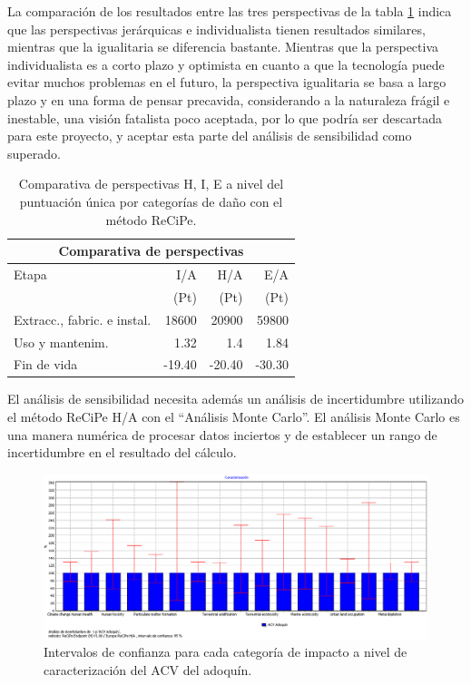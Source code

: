 La comparación de los resultados entre las tres perspectivas de la tabla \ref{comparativa_perspectivas} indica que las perspectivas jerárquicas e individualista tienen resultados similares, mientras que la igualitaria se diferencia bastante. Mientras que la perspectiva individualista es a corto plazo y optimista en cuanto a que la tecnología puede evitar muchos problemas en el futuro, la perspectiva igualitaria se basa a largo plazo y en una forma de pensar precavida, considerando a la naturaleza frágil e inestable, una visión fatalista poco aceptada, por lo que podría ser descartada para este proyecto, y aceptar esta parte del análisis de sensibilidad como superado.

\begin{table}[!htb]
\centering
\begin{tabular}{p{6cm}rrr}
\toprule
\multicolumn{4}{c}{Comparativa de perspectivas}\\
\midrule
Etapa & I/A & H/A & E/A\\
 & (Pt) & (Pt) & (Pt)\\
\midrule
Extracc., fabric. e instal. & 18600 & 20900 & 59800\\
Uso y mantenim. &1.32 & 1.4 & 1.84\\
Fin de vida &-19.40 & -20.40 & -30.30\\
\bottomrule
\end{tabular}
\caption{Comparativa de perspectivas H, I, E a nivel del puntuación única por categorías de daño con el método ReCiPe.}
\label{comparativa_perspectivas}
\end{table}

El análisis de sensibilidad necesita además un análisis de incertidumbre utilizando el método ReCiPe H/A con el ``Análisis Monte Carlo''. El análisis Monte Carlo es una manera numérica de procesar datos inciertos y de establecer un rango de incertidumbre en el resultado del cálculo.

\begin{figure}[!htb]
\centering
\includegraphics[width=15cm]{img/confianza_caracterizacion.png}
\caption{Intervalos de confianza para cada categoría de impacto a nivel de caracterización del ACV del adoquín.}
\label{fig:confianza_caracterizacion}
\end{figure}

